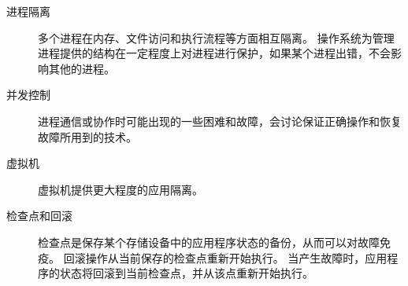 {{        \begin{description}
            \item[进程隔离]
            {
                多个进程在内存、文件访问和执行流程等方面相互隔离。
                操作系统为管理进程提供的结构在一定程度上对进程进行保护，如果某个进程出错，不会影响其他的进程。
            }
            \item[并发控制] 进程通信或协作时可能出现的一些困难和故障，会讨论保证正确操作和恢复故障所用到的技术。
            \item[虚拟机] 虚拟机提供更大程度的应用隔离。
            \item[检查点和回滚]
            {
                检查点是保存某个存储设备中的应用程序状态的备份，从而可以对故障免疫。
                回滚操作从当前保存的检查点重新开始执行。
                当产生故障时，应用程序的状态将回滚到当前检查点，并从该点重新开始执行。
            }
        \end{description}
    }
}
